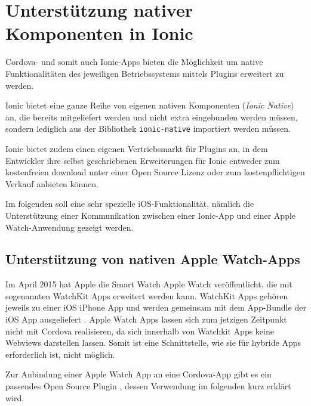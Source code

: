 \chapter{Unterstützung nativer Komponenten in Ionic}
%
Cordova- und somit auch Ionic-Apps bieten die Möglichkeit um native Funktionalitäten des jeweiligen Betriebssystems mittels Plugins erweitert zu werden.

Ionic bietet eine ganze Reihe von eigenen nativen Komponenten (\emph{Ionic Native}) an, die bereits mitgeliefert werden und nicht extra eingebunden werden müssen, sondern lediglich aus der Bibliothek \texttt{ionic-native} importiert werden müssen.

Ionic bietet zudem einen eigenen Vertriebsmarkt für Plugins an, in dem Entwickler ihre selbst geschriebenen Erweiterungen für Ionic entweder zum kostenfreien download unter einer Open Source Lizenz oder zum kostenpflichtigen Verkauf anbieten können. 

Im folgenden soll eine sehr spezielle iOS-Funktionalität, nämlich die Unterstützung einer Kommunikation zwischen einer Ionic-App und einer Apple Watch-Anwendung gezeigt werden.
%
\section{Unterstützung von nativen Apple Watch-Apps}
%
Im April 2015 hat Apple die Smart Watch Apple Watch veröffentlicht, die mit sogenannten WatchKit Apps erweitert werden kann. WatchKit Apps gehören jeweils zu einer iOS iPhone App und werden gemeinsam mit dem App-Bundle der iOS App ausgeliefert \cite{appleAppleWatchProgrammingGuide}. Apple Watch Apps lassen sich zum jetzigen Zeitpunkt nicht mit Cordova realisieren, da sich innerhalb von Watchkit Apps keine Webviews darstellen lassen. Somit ist eine Schnittstelle, wie sie für hybride Apps erforderlich ist, nicht möglich.

Zur Anbindung einer Apple Watch App an eine Cordova-App gibt es ein passendes Open Source Plugin \cite{CrossleyCordovaAppleWatchPlugin}, dessen Verwendung im folgenden kurz erklärt wird.

